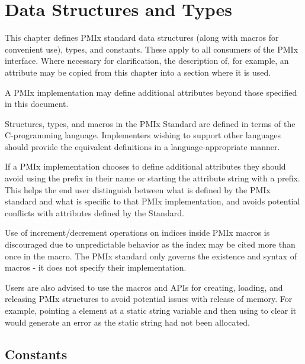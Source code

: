 \chapter{Data Structures and Types}
\label{chap:struct}

This chapter defines \ac{PMIx} standard data structures (along with macros for convenient use), types, and constants.
These apply to all consumers of the \ac{PMIx} interface.
Where necessary for clarification, the description of, for example, an attribute may be copied from this chapter into a section where it is used.

A PMIx implementation may define additional attributes beyond those specified in this document.

\adviceimplstart
Structures, types, and macros in the \ac{PMIx} Standard are defined in terms of the C-programming language. Implementers wishing to support other languages should provide the equivalent definitions in a language-appropriate manner.

If a PMIx implementation chooses to define additional attributes they should avoid using the  prefix in their name or starting the attribute string with a  prefix.
This helps the end user distinguish between what is defined by the PMIx standard and what is specific to that PMIx implementation, and avoids potential conflicts with attributes defined by the Standard.
\adviceimplend

\adviceuserstart
Use of increment/decrement operations on indices inside \ac{PMIx} macros is discouraged due to unpredictable behavior as the index may be cited more than once in
the macro. The \ac{PMIx} standard only governs the existence and syntax of macros - it does not specify their implementation.

Users are also advised to use the macros and \acp{API} for creating, loading, and releasing
\ac{PMIx} structures to avoid potential issues with release of memory. For
example, pointing a  element at a static string
variable and then using  to clear it would
generate an error as the static string had not been allocated.

\adviceuserend

\section{Constants}
\label{chap:struct:const}

